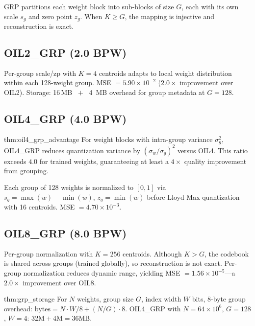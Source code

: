 GRP partitions each weight block into sub-blocks of size $G$, each
with its own scale $s_g$ and zero point $z_g$. When $K \geq G$, the
mapping is injective and reconstruction is exact.

\subsection{OIL2\_GRP (2.0 BPW)}

Per-group scale/zp with $K=4$ centroids adapts to local weight
distribution within each 128-weight group. MSE $= 5.90 \times 10^{-2}$
($2.0\times$ improvement over OIL2). Storage: 16\,MB $\;+\;$ 4~MB
overhead for group metadata at $G=128$.

\subsection{OIL4\_GRP (4.0 BPW)}

\begin{mythm}{thm:oil4_grp_advantage}
For weight blocks with intra-group variance $\sigma_g^2$, OIL4\_GRP
reduces quantization variance by $(\sigma_w / \sigma_g)^2$ versus
OIL4. This ratio exceeds $4.0$ for trained weights, guaranteeing at
least a $4\times$ quality improvement from grouping.
\end{mythm}

Each group of 128 weights is normalized to $[0,1]$ via
$s_g = \max(w) - \min(w)$, $z_g = \min(w)$ before Lloyd-Max
quantization with 16 centroids. MSE $= 4.70 \times 10^{-3}$.

\subsection{OIL8\_GRP (8.0 BPW)}

Per-group normalization with $K=256$ centroids. Although $K > G$, the
codebook is shared across groups (trained globally), so reconstruction
is not exact. Per-group normalization reduces dynamic range, yielding
MSE $= 1.56 \times 10^{-5}$---a $2.0\times$ improvement over OIL8.

\begin{mythm}{thm:grp_storage}
For $N$ weights, group size $G$, index width $W$ bits, 8-byte group
overhead: $\mathrm{bytes} = N \cdot W / 8 + (N / G) \cdot 8$.
OIL4\_GRP with $N=64\times10^6$, $G=128$, $W=4$:
$32\text{M} + 4\text{M} = 36\text{MB}$.
\end{mythm}

